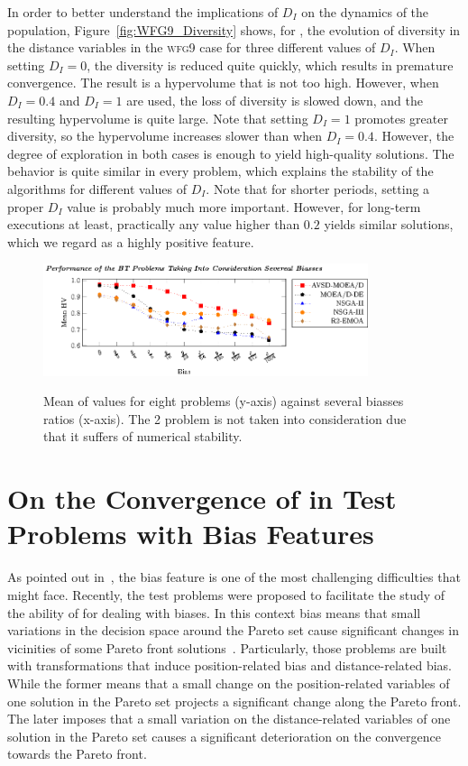 In order to better understand the implications of $D_I$ on the dynamics of the population, Figure~\ref{fig:WFG9_Diversity}
shows, for \AVSDMOEAD{}, the evolution of diversity in the distance variables in the \textsc{wfg9} case for three different values of $D_I$.
%
When setting $D_I = 0$, the diversity is reduced quite quickly, which results in premature convergence.
%
The result is a hypervolume that is not too high.
%
However, when $D_I = 0.4$ and $D_I = 1$ are used, the loss of diversity is slowed down, and the resulting hypervolume is quite large.
%
Note that setting $D_I = 1$ promotes greater diversity, so the hypervolume increases slower than when
$D_I = 0.4$.
%
However, the degree of exploration in both cases is enough to yield high-quality solutions.
%
The behavior is quite similar in every problem, which explains the stability of the algorithms for
different values of $D_I$.
%
Note that for shorter periods, setting a proper $D_I$ value is probably much more important.
%
However, for long-term executions at least, practically any value higher than $0.2$ yields similar solutions,
which we regard as a highly positive feature.
\begin{figure}[t]
\centering
\includegraphics[width=0.85\textwidth]{images/BIAS_Full-figure0.eps} \\
\caption{Mean of \HV{} values for eight \BTS{} problems (y-axis) against several biasses ratios (x-axis). The \BT{}2 problem is not taken into consideration due that it suffers of numerical stability.}\label{fig:BT}
\end{figure}

\section{On the Convergence of \MOEAS{} in Test Problems with Bias Features}

As pointed out in~\cite{li2016biased, deb1999multi, huband2006review}, the bias feature is one of the most challenging difficulties that \MOEAS{} might face.
%
Recently, the \BTS{} test problems were proposed to facilitate the study of the ability of \MOEAS{} for dealing with biases.
%
In this context bias means that small variations in the decision space around the Pareto set cause significant changes in vicinities of some Pareto front solutions~\cite{huband2006review}.
%
Particularly, those problems are built with transformations that induce position-related bias and distance-related bias.
%
While the former means that a small change on the position-related variables of one solution in the Pareto set projects a significant change along the Pareto front.
%
The later imposes that a small variation on the distance-related variables of one solution in the Pareto set causes a significant deterioration on the convergence towards the Pareto front.
%

